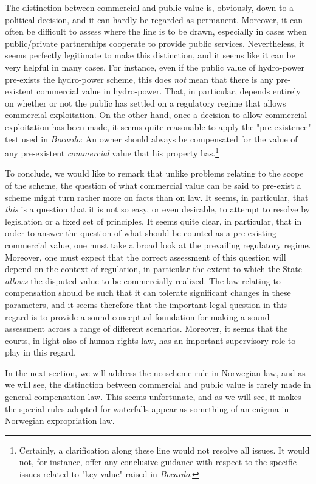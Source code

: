 The distinction between commercial and public value is, obviously, down to a political decision, and it can hardly be regarded as permanent. Moreover, it can often be difficult to assess where the line is to be drawn, especially in cases when public/private partnerships cooperate to provide public services. Nevertheless, it seems perfectly legitimate to make this distinction, and it seems like it can be very helpful in many cases. For instance, even if the public value of hydro-power pre-exists the hydro-power scheme, this does \emph{not} mean that there is any pre-existent commercial value in hydro-power. That, in particular, depends entirely on whether or not the public has settled on a regulatory regime that allows commercial exploitation. On the other hand, once a decision to allow commercial exploitation has been made, it seems quite reasonable to apply the "pre-existence" test used in \emph{Bocardo}: An owner should always be compensated for the value of any pre-existent \emph{commercial} value that his property has.\footnote{Certainly, a clarification along these line would not resolve all issues. It would not, for instance, offer any conclusive guidance with respect to the specific issues related to "key value" raised in \emph{Bocardo}.} 

To conclude, we would like to remark that unlike problems relating to the scope of the scheme, the question of what commercial value can be said to pre-exist a scheme might turn rather more on facts than on law. It seems, in particular, that \emph{this} is a question that it is not so easy, or even desirable, to attempt to resolve by legislation or a fixed set of principles. It seems quite clear, in particular, that in order to answer the question of what should be counted as a pre-existing commercial value, one must take a broad look at the prevailing regulatory regime. Moreover, one must expect that the correct assessment of this question will depend on the context of regulation, in particular the extent to which the State \emph{allows} the disputed value to be commercially realized. The law relating to compensation should be such that it can tolerate significant changes in these parameters, and it seems therefore that the important legal question in this regard is to provide a sound conceptual foundation for making a sound assessment across a range of different scenarios. Moreover, it seems that the courts, in light also of human rights law, has an important supervisory role to play in this regard.

In the next section, we will address the no-scheme rule in Norwegian law, and as we will see, the distinction between commercial and public value is rarely made in general compensation law. This seems unfortunate, and as we will see, it makes the special rules adopted for waterfalls appear as something of an enigma in Norwegian expropriation law.

